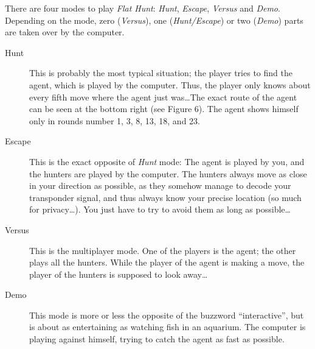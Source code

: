 There are four modes to play \emph{Flat Hunt}: \emph{Hunt}, \emph{Escape}, \emph{Versus} and \emph{Demo}. Depending on the mode, zero (\emph{Versus}), one (\emph{Hunt/Escape}) or two (\emph{Demo}) parts are taken over by the computer.

  \begin{description}
    
    \item[Hunt]This is probably the most typical situation; the player tries to find the agent, which is played by the computer. Thus, the player only knows about every fifth move where the agent just was\ldots The exact route of the agent can be seen at the bottom right (see Figure 6). The agent shows himself only in rounds number 1, 3, 8, 13, 18, and 23.
    
    \item[Escape]This is the exact opposite of \emph{Hunt} mode: The agent is played by you, and the hunters are played by the computer. The hunters always move as close in your direction as possible, as they somehow manage to decode your transponder signal, and thus always know your precise location (so much for privacy\ldots). You just have to try to avoid them as long as possible\ldots
  
    \item[Versus]This is the multiplayer mode. One of the players is the agent; the other plays all the hunters. While the player of the agent is making a move, the player of the hunters is supposed to look away\ldots
   
    \item[Demo]This mode is more or less the opposite of the buzzword ``interactive'', but is about as entertaining as watching fish in an aquarium. The computer is playing against himself, trying to catch the agent as fast as possible.
  
  \end{description}

